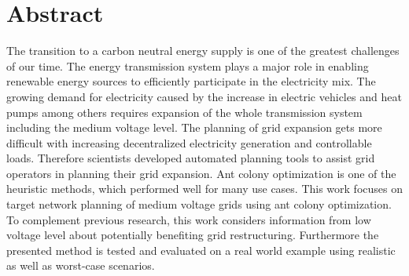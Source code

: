 \chapter*{Abstract}
The transition to a carbon neutral energy supply is one of the greatest challenges of our time. The energy transmission system plays a major role in enabling renewable energy sources to efficiently participate in the electricity mix. The growing demand for electricity caused by the increase in electric vehicles and heat pumps among others requires expansion of the whole transmission system including the medium voltage level. The planning of grid expansion gets more difficult with increasing decentralized electricity generation and controllable loads. Therefore scientists developed automated planning tools to assist grid operators in planning their grid expansion. Ant colony optimization is one of the heuristic methods, which performed well for many use cases. This work focuses on target network planning of medium voltage grids using ant colony optimization. To complement previous research, this work considers information from low voltage level about potentially benefiting grid restructuring. Furthermore the presented method is tested and evaluated on a real world example using realistic as well as worst-case scenarios.